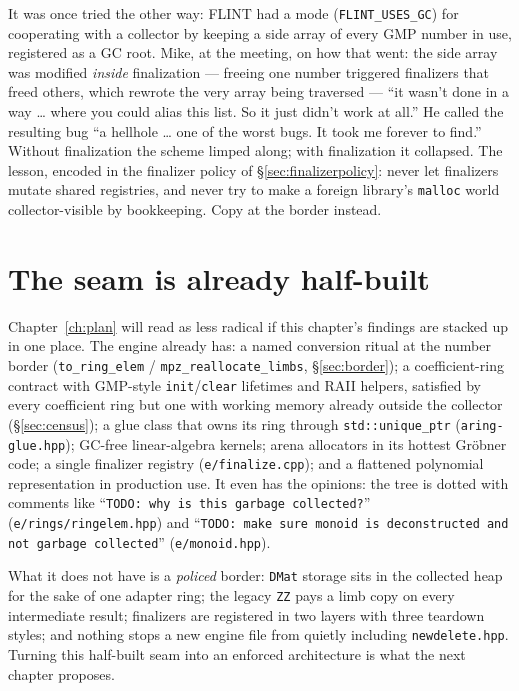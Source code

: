 \documentclass[11pt,oneside]{report}
\newcommand{\code}[1]{\textcolor{m2code}{\texttt{#1}}}
\newcommand{\file}[1]{\textcolor{m2file}{\texttt{#1}}}
\begin{document}
\begin{warstory}
It was once tried the other way: FLINT had a mode (\code{FLINT\_USES\_GC})
for cooperating with a collector by keeping a side array of every GMP
number in use, registered as a GC root. Mike, at the meeting, on how that
went: the side array was modified \emph{inside} finalization --- freeing
one number triggered finalizers that freed others, which rewrote the very
array being traversed --- ``it wasn't done in a way \ldots{} where you
could alias this list. So it just didn't work at all.'' He called the
resulting bug ``a hellhole \ldots{} one of the worst bugs. It took me
forever to find.'' Without finalization the scheme limped along; with
finalization it collapsed. The lesson, encoded in the finalizer policy of
\S\ref{sec:finalizerpolicy}: never let finalizers mutate shared registries,
and never try to make a foreign library's \code{malloc} world
collector-visible by bookkeeping. Copy at the border instead.
\end{warstory}

\section{The seam is already half-built}
\label{sec:seam}

Chapter~\ref{ch:plan} will read as less radical if this chapter's findings
are stacked up in one place. The engine already has: a named conversion
ritual at the number border (\code{to\_ring\_elem} /
\code{mpz\_reallocate\_limbs}, \S\ref{sec:border}); a coefficient-ring
contract with GMP-style \code{init}/\code{clear} lifetimes and RAII
helpers, satisfied by every coefficient ring but one with working memory
already outside the collector (\S\ref{sec:census}); a glue class that owns its ring
through \code{std::unique\_ptr} (\file{aring-glue.hpp}); GC-free
linear-algebra kernels; arena allocators in its hottest Gr\"obner code; a
single finalizer registry (\file{e/finalize.cpp}); and a flattened
polynomial representation in production use. It even has the opinions: the
tree is dotted with comments like ``\code{TODO: why is this garbage
collected?}'' (\file{e/rings/ringelem.hpp}) and ``\code{TODO: make sure
monoid is deconstructed and not garbage collected}''
(\file{e/monoid.hpp}).

What it does not have is a \emph{policed} border: \code{DMat} storage sits
in the collected heap for the sake of one adapter ring; the legacy
\code{ZZ} pays a limb copy on every intermediate result; finalizers are
registered in two layers with three teardown styles; and nothing stops a
new engine file from quietly including \file{newdelete.hpp}. Turning this
half-built seam into an enforced architecture is what the next chapter
proposes.
\end{document}
